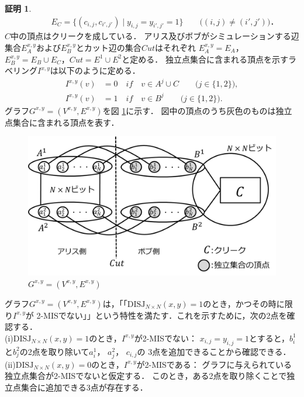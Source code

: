 \documentclass[12pt]{thesis}
\theoremstyle{definition}
\newtheorem*{prf*}{証明}
\begin{document}
\begin{prf*}
\begin{align*}
&\phantom{=} \quad E_{C} = \{(c_{i,j}, c_{i',j'}) \mid y_{i,j}=y_{i',j'}=1\} \quad \quad \text{($(i, j) \neq (i', j')$)}．
\end{align*}
$C$中の頂点はクリークを成している．
アリス及びボブがシミュレーションする辺集合$E^{x,y}_A$および$E^{x,y}_B$とカット辺の集合$\mathit{Cut}$はそれぞれ
$E^{x,y}_{A} = E_{A}$，$E^{x,y}_{B} = E_{B} \cup E_{C}$，$\mathit{Cut} = E^{1} \cup E^{2}$と定める．
独立点集合に含まれる頂点を示すラベリング$I^{x,y}$は以下のように定める．
\begin{align*}
I^{x,y}(v) &= 0 \quad if \quad v \in A^{j} \cup C \quad \quad \text{($j \in \{1, 2\}$)}, \\
I^{x,y}(v) &= 1 \quad if \quad v \in B^{j} \quad \quad \text{($j \in \{1, 2\}$)}.
\end{align*}
グラフ$G^{x, y} = (V^{x,y}, E^{x,y})$を図 \ref{2_G(x,y)}に示す．
図中の頂点のうち灰色のものは独立点集合に含まれる頂点を表す．
\begin{figure}[ht]
\begin{center}
\includegraphics[width=120mm]{2_Gxy.png}
\end{center}
\caption{$G^{x, y} = (V^{x,y}, E^{x,y})$}
\label{2_G(x,y)}
\end{figure}
グラフ$G^{x, y} = (V^{x,y}, E^{x,y})$は，「「$\mathrm{DISJ}_{N \times N} (x, y) = 1$のとき，かつその時に限り$I^{x,y}$が
2-MISでない」」という特性を満たす．これを示すために，次の2点を確認する． \\
(i)$\mathrm{DISJ}_{N \times N} (x, y) = 1$のとき，$I^{x,y}$が2-MISでない： 
$x_{i, j} = y_{i, j} =1$とすると，$b_{i}^{1}$と$b_{j}^{2}$の2点を取り除いて$a_{i}^{1}$， $a_{j}^{2}$， $c_{i, j}$の
3点を追加できることから確認できる． \\
(ii)$\mathrm{DISJ}_{N \times N} (x, y) = 0$のとき，$I^{x,y}$が2-MISである： 
グラフに与えられている独立点集合が2-MISでないと仮定する．
このとき，ある2点を取り除くことで独立点集合に追加できる3点が存在する．

\end{prf*}
\end{document}
